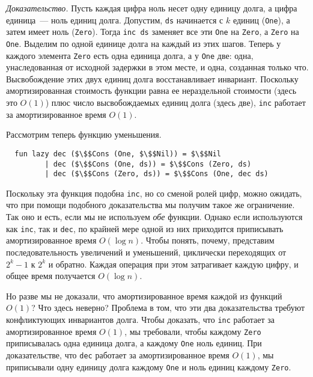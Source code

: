 \emph{Доказательство.} Пусть каждая цифра ноль несет одну единицу долга, а
цифра единица~--- ноль единиц долга. Допустим, \lstinline!ds!
начинается с $k$ единиц (\lstinline!One!), а затем имеет ноль
(\lstinline!Zero!). Тогда \lstinline!inc ds! заменяет все эти \lstinline!One!
на \lstinline!Zero!, а \lstinline!Zero! на \lstinline!One!. 
Выделим по одной единице долга на каждый
из этих шагов. Теперь у каждого элемента \lstinline!Zero! есть одна
единица долга, а у \lstinline!One! две: одна, унаследованная от
исходной задержки в этом месте, и одна, созданная только
что. Высвобождение этих двух единиц долга восстанавливает
инвариант. Поскольку амортизированная стоимость функции равна ее
нераздельной стоимости (здесь это $O(1)$) плюс число высвобождаемых
единиц долга (здесь две), \lstinline!inc! работает за амортизированное
время $O(1)$.

Рассмотрим теперь функцию уменьшения.
\begin{lstlisting}
  fun lazy dec ($\$$Cons (One, $\$$Nil)) = $\$$Nil
         | dec ($\$$Cons (One, ds)) = $\$$Cons (Zero, ds)
         | dec ($\$$Cons (Zero, ds)) = $\$$Cons (One, dec ds)
\end{lstlisting}
Поскольку эта функция подобна \lstinline!inc!, но
со сменой ролей цифр, можно ожидать, что при помощи подобного
доказательства мы получим такое же ограничение. Так оно и есть, если
мы не используем \emph{обе} функции. Однако если используются как
\lstinline!inc!, так и \lstinline!dec!, по крайней мере одной из них
приходится приписывать амортизированное время $O(\log n)$. Чтобы понять,
почему, представим последовательность увеличений и уменьшений,
циклически переходящих от $2^k - 1$ к $2^k$ и обратно. Каждая операция
при этом затрагивает каждую цифру, и общее время получается $O(\log
n)$.

Но разве мы не доказали, что амортизированное время каждой из функций
$O(1)$? Что здесь неверно? Проблема в том, что эти два доказательства
требуют конфликтующих инвариантов долга. Чтобы доказать, что
\lstinline!inc! работает за амортизированное время $O(1)$, мы
требовали, чтобы каждому \lstinline!Zero! приписывалась одна единица
долга, а каждому \lstinline!One! ноль единиц. При доказательстве, что
\lstinline!dec! работает за амортизированное время $O(1)$, мы
приписывали одну единицу долга каждому \lstinline!One! и ноль единиц
каждому \lstinline!Zero!.


